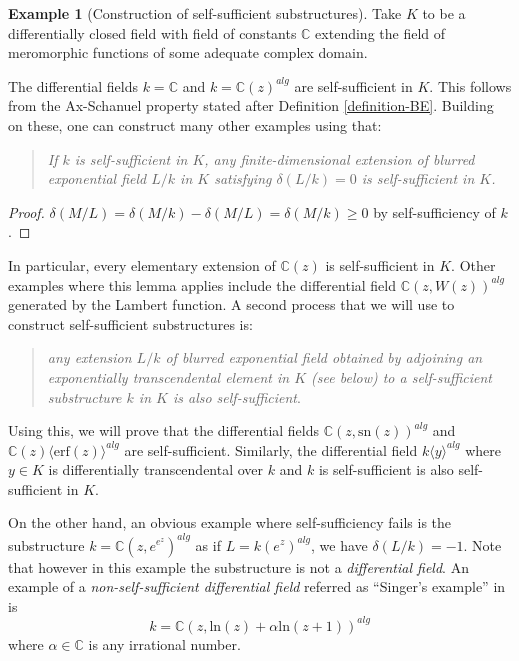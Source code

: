 \documentclass[12pt]{amsart}
\theoremstyle{definition}
\newtheorem{exam}[defn]{Example}
\theoremstyle{plain}
\theoremstyle{exampstyle}\newtheorem{thmx}{Theorem}
\theoremstyle{exampstyle}\newtheorem{thmxbis}{Theorem}
\begin{document}
\begin{exam}[Construction of self-sufficient substructures] \label{example-selfsufficient} Take $K$ to be a differentially closed field with field of constants $\mathbb{C}$ extending the field of meromorphic functions of some adequate complex domain. 

The differential fields $k = \mathbb{C}$ and $k = \mathbb{C}(z)^{alg}$ are self-sufficient in $K$. This follows from the Ax-Schanuel property stated after Definition \ref{definition-BE}. Building on these, one can construct many other examples using that: 

\begin{quote}
\textit{If $k$ is self-sufficient in $K$, any finite-dimensional extension of blurred exponential field $L/k$ in $K$ satisfying $\delta(L/k) = 0$ is self-sufficient in $K$.}
\end{quote} 
\begin{proof}
$\delta(M/L) = \delta(M/k) - \delta(M/L) = \delta(M/k) \geq 0$ by self-sufficiency of $k$.
\end{proof} 
In particular, every elementary extension of $\mathbb{C}(z)$ is self-sufficient in $K$.
Other examples where this lemma applies include the differential field $ \mathbb{C}(z,W(z))^{alg}$ generated by the Lambert function. A second process that we will use to construct self-sufficient substructures is: 
\begin{quote} 
\textit{any extension $L/k$ of blurred exponential field  obtained by adjoining an exponentially transcendental element in $K$ (see below) to a self-sufficient substructure $k$ in $K$ is also self-sufficient}. 
\end{quote}
Using this, we will prove that the differential fields  $ \mathbb{C}(z, \mathrm{sn}(z))^{alg}$ and  $\mathbb{C}(z)\langle \mathrm{erf}(z) \rangle^{alg}$ are self-sufficient. Similarly, the differential field $k \langle y \rangle^{alg}$ where $y \in K$ is differentially transcendental over $k$ and $k$ is self-sufficient is also self-sufficient in $K$.

On the other hand, an obvious example where self-sufficiency fails is the substructure $k = \mathbb{C}(z,e^{e^{z}})^{alg}$ as if $L = k(e^z)^{alg}$, we have $\delta(L/k) = - 1$. Note that however in this example the substructure is not a {\em differential field}. An example of a {\em non-self-sufficient differential field} referred as ``Singer's example'' in \cite[Remark 1]{Rosenlicht-Singer} is 
$$k = \mathbb{C}(z, \mathrm{ln}(z) + \alpha \mathrm{ln}(z+1))^{alg}$$
where $\alpha \in \mathbb{C}$ is any irrational number.
\end{exam}
\end{document}

